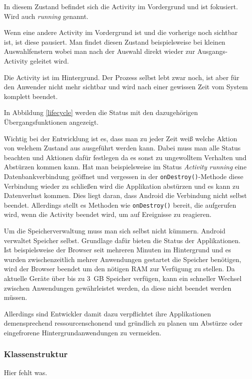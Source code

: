 \begin{description}[style=nextline]
	\item[Resumed] In diesem Zustand befindet sich die Activity im Vordergrund und ist fokusiert. Wird auch \emph{running} genannt.
	\item[Paused] Wenn eine andere Activity im Vordergrund ist und die vorherige noch sichtbar ist, ist diese pausiert. Man findet diesen Zustand beispielsweise bei kleinen Auswahlfenstern wobei man nach der Auswahl direkt wieder zur Ausgangs-Activity geleitet wird.
	\item[Stopped] Die Activity ist im Hintergrund. Der Prozess selbst lebt zwar noch, ist aber für den Anwender nicht mehr sichtbar und wird nach einer gewissen Zeit vom System komplett beendet. 
\end{description}

In Abbildung \ref{lifecycle} werden die Status mit den dazugehörigen Übergangsfunktionen angezeigt.

Wichtig bei der Entwicklung ist es, dass man zu jeder Zeit weiß welche Aktion von welchem Zustand aus ausgeführt werden kann. Dabei muss man alle Status beachten und Aktionen dafür festlegen da es sonst zu ungewolltem Verhalten und Abstürzen kommen kann. Hat man beispielsweise im Status \emph{Activity running} eine Datenbankverbindung geöffnet und vergessen in der \verb+onDestroy()+-Methode diese Verbindung wieder zu schließen wird die Applikation abstürzen und es kann zu Datenverlust kommen. Dies liegt daran, dass Android die Verbindung nicht selbst beendet. Allerdings stellt es Methoden wie \verb+onDestroy()+ bereit, die aufgerufen wird, wenn die Activity beendet wird, um auf Ereignisse zu reagieren.

Um die Speicherverwaltung muss man sich selbst nicht kümmern. Android verwaltet Speicher selbst. Grundlage dafür bieten die Status der Applikationen. Ist beispielsweise der Browser seit mehreren Minuten im Hintergrund und es wurden zwischenzeitlich mehrer Anwendungen gestartet die Speicher benötigen, wird der Browser beendet um den nötigen RAM zur Verfügung zu stellen. Da aktuelle Geräte über bis zu \SI{3}{GB} Speicher verfügen, kann ein schneller Wechsel zwischen Anwendungen gewährleistet werden, da diese nicht beendet werden müssen.

Allerdings sind Entwickler damit dazu verpflichtet ihre Applikationen demensprechend ressourcenschonend und gründlich zu planen um Abstürze oder eingefrorene Hintergrundanwendungen zu vermeiden.

\subsubsection{Klassenstruktur}

Hier fehlt was.